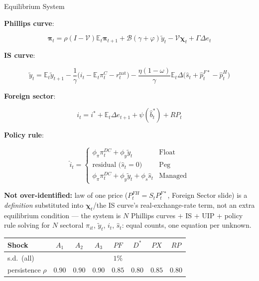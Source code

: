 \documentclass[aspectratio=43, 10pt]{beamer}
\begin{document}
\begin{frame}{Equilibrium System}

\footnotesize
\setlength{\abovedisplayskip}{1pt}
\setlength{\belowdisplayskip}{1pt}
\setlength{\abovedisplayshortskip}{0pt}
\setlength{\belowdisplayshortskip}{1pt}
\setlength{\parskip}{0pt}

\textbf{Phillips curve}:

\[
\bm\pi_t=\rho(I-\mathcal V)\mathbb E_t\bm\pi_{t+1}+\mathcal B(\gamma+\varphi)\tilde y_t-\mathcal V\bm\chi_t+\Gamma\Delta e_t
\]

\textbf{IS curve}:

\[
\tilde y_t=\mathbb E_t\tilde y_{t+1}-\frac{1}{\gamma}\big(i_t-\mathbb E_t\pi_t^C-r_t^{\mathrm{nat}}\big)-\frac{\eta(1-\omega)}{\gamma}\mathbb E_t\Delta\big(\hat s_t+\hat p_t^{F*}-\hat p_t^H\big)
\]

\textbf{Foreign sector}:

\[
i_t=i^*+\mathbb E_t\Delta e_{t+1}+\psi(\hat b_t^*)+RP_t
\]

\textbf{Policy rule}:

\[
\hat i_t=
\begin{cases}
\phi_\pi\pi_t^{DC}+\phi_y\tilde y_t & \text{Float}\\[2pt]
\text{residual (}\hat s_t=0\text{)} & \text{Peg}\\[2pt]
\phi_\pi\pi_t^{DC}+\phi_y\tilde y_t+\phi_s\hat s_t & \text{Managed}
\end{cases}
\]



\vspace{6pt}
{\scriptsize \textbf{Not over-identified:} law of one price ($P_t^{FH}=S_tP_t^{F*}$, Foreign Sector slide) is a \emph{definition} substituted into $\bm\chi_t$/the IS curve's real-exchange-rate term, not an extra equilibrium condition --- the system is $N$ Phillips curves $+$ IS $+$ UIP $+$ policy rule solving for $N$ sectoral $\pi_{it}$, $\tilde y_t$, $i_t$, $\hat s_t$: equal counts, one equation per unknown.}

\vspace{6pt}
{\scriptsize
\renewcommand{\arraystretch}{1.25}
\begin{tabular}{@{}lccccccc@{}}
\toprule
\textbf{Shock} & $A_1$ & $A_2$ & $A_3$ & $PF$ & $D^*$ & $PX$ & $RP$ \\
\midrule
s.d.\ (all) & \multicolumn{7}{c}{$1\%$} \\
persistence $\rho$ & $0.90$ & $0.90$ & $0.90$ & $0.85$ & $0.80$ & $0.85$ & $0.80$ \\
\bottomrule
\end{tabular}}

\end{frame}
\end{document}
